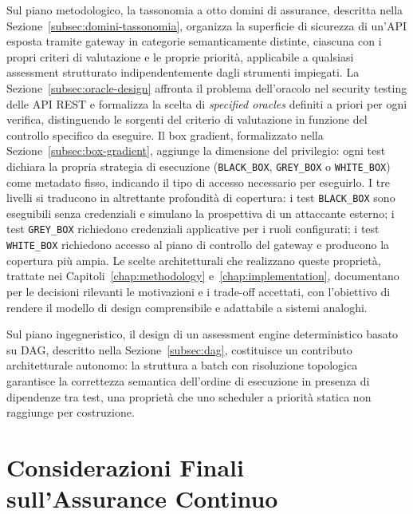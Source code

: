 Sul piano metodologico, la tassonomia a otto domini di assurance, descritta nella Sezione~\ref{subsec:domini-tassonomia}, organizza la superficie di sicurezza di un'\gls{API} esposta tramite gateway in categorie semanticamente distinte, ciascuna con i propri criteri di valutazione e le proprie priorità, applicabile a qualsiasi assessment strutturato indipendentemente dagli strumenti impiegati. La Sezione~\ref{subsec:oracle-design} affronta il problema dell'oracolo nel security testing delle \gls{API} \gls{REST} e formalizza la scelta di \emph{specified oracles} definiti a priori per ogni verifica, distinguendo le sorgenti del criterio di valutazione in funzione del controllo specifico da eseguire. Il box gradient, formalizzato nella Sezione~\ref{subsec:box-gradient}, aggiunge la dimensione del privilegio: ogni test dichiara la propria strategia di esecuzione (\texttt{BLACK\_BOX}, \texttt{GREY\_BOX} o \texttt{WHITE\_BOX}) come metadato fisso, indicando il tipo di accesso necessario per eseguirlo. I tre livelli si traducono in altrettante profondità di copertura: i test \texttt{BLACK\_BOX} sono eseguibili senza credenziali e simulano la prospettiva di un attaccante esterno; i test \texttt{GREY\_BOX} richiedono credenziali applicative per i ruoli configurati; i test \texttt{WHITE\_BOX} richiedono accesso al piano di controllo del gateway e producono la copertura più ampia. Le scelte architetturali che realizzano queste proprietà, trattate nei Capitoli~\ref{chap:methodology} e~\ref{chap:implementation}, documentano per le decisioni rilevanti le motivazioni e i trade-off accettati, con l'obiettivo di rendere il modello di design comprensibile e adattabile a sistemi analoghi.

Sul piano ingegneristico, il design di un assessment engine deterministico basato su \gls{DAG}, descritto nella Sezione~\ref{subsec:dag}, costituisce un contributo architetturale autonomo: la struttura a batch con risoluzione topologica garantisce la correttezza semantica dell'ordine di esecuzione in presenza di dipendenze tra test, una proprietà che uno scheduler a priorità statica non raggiunge per costruzione.


\section{Considerazioni Finali sull'Assurance Continuo}%
\label{sec:assurance-continuo}


